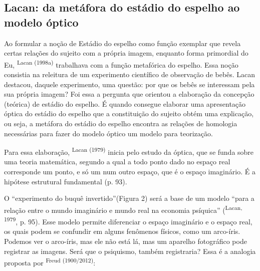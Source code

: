 \begin{multicols}{2}
\section*{Lacan:\allowbreak{} da metáfora do estádio do espelho ao modelo óptico}
\par{}Ao formular a noção de Estádio do espelho como função exemplar que revela certas relações do sujeito com a própria imagem,\allowbreak{} enquanto forma primordial do Eu,\allowbreak{} \textsuperscript{Lacan (\allowbreak{}1998a)\allowbreak{}} trabalhava com a função metafórica do espelho.\allowbreak{} Essa noção consistia na releitura de um experimento científico de observação de bebês.\allowbreak{} Lacan destacou,\allowbreak{} daquele experimento,\allowbreak{} uma questão:\allowbreak{} por que os bebês se interessam pela sua própria imagem? Foi essa a pergunta que orientou a elaboração da concepção (\allowbreak{}teórica)\allowbreak{} de estádio do espelho.\allowbreak{} É quando consegue elaborar uma apresentação óptica do estádio do espelho que a constituição do sujeito obtém uma explicação,\allowbreak{} ou seja,\allowbreak{} a metáfora do estádio do espelho encontra as relações de homologia necessárias para fazer do modelo óptico um modelo para teorização.\allowbreak{}\par{}Para essa elaboração,\allowbreak{} \textsuperscript{Lacan (\allowbreak{}1979)\allowbreak{}} inicia pelo estudo da óptica,\allowbreak{} que se funda sobre uma teoria matemática,\allowbreak{} segundo a qual a todo ponto dado no espaço real corresponde um ponto,\allowbreak{} e só um num outro espaço,\allowbreak{} que é o espaço imaginário.\allowbreak{} É a hipótese estrutural fundamental (\allowbreak{}p.\allowbreak{} 93)\allowbreak{}.\allowbreak{}\par{}O “experimento do buquê invertido”(\allowbreak{}Figura 2)\allowbreak{} será a base de um modelo “para a relação entre o mundo imaginário e mundo real na economia psíquica” (\allowbreak{}\textsuperscript{Lacan,\allowbreak{} 1979},\allowbreak{} p.\allowbreak{} 95)\allowbreak{}.\allowbreak{} Esse modelo permite diferenciar o espaço imaginário e o espaço real,\allowbreak{} os quais podem se confundir em alguns fenômenos físicos,\allowbreak{} como um arco-\allowbreak{}íris.\allowbreak{} Podemos ver o arco-\allowbreak{}íris,\allowbreak{} mas ele não está lá,\allowbreak{} mas um aparelho fotográfico pode registrar as imagens.\allowbreak{} Será que o psiquismo,\allowbreak{} também registraria? Essa é a analogia proposta por \textsuperscript{Freud (\allowbreak{}1900\fshyp{}2012)\allowbreak{}}:\allowbreak{}\par{}

\end{multicols}
